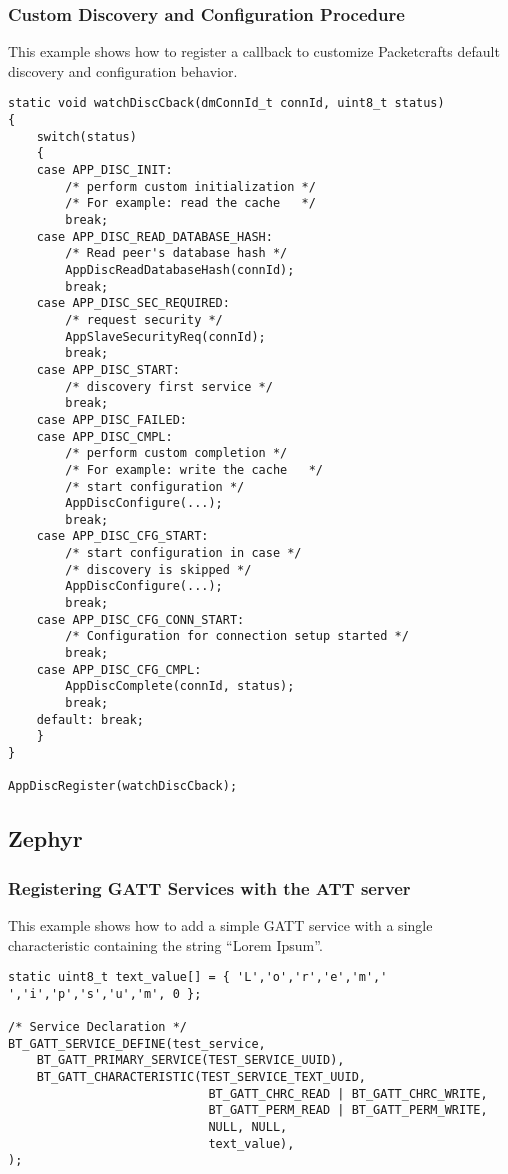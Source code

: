\subsubsection{Custom Discovery and Configuration Procedure}
This example shows how to register a callback to customize Packetcrafts default discovery and configuration behavior.
\begin{lstlisting}
static void watchDiscCback(dmConnId_t connId, uint8_t status)
{
    switch(status)
    {
    case APP_DISC_INIT:
        /* perform custom initialization */
        /* For example: read the cache   */
        break;
    case APP_DISC_READ_DATABASE_HASH:
        /* Read peer's database hash */
        AppDiscReadDatabaseHash(connId);
        break;
    case APP_DISC_SEC_REQUIRED:
        /* request security */
        AppSlaveSecurityReq(connId);
        break;
    case APP_DISC_START:
        /* discovery first service */
        break;
    case APP_DISC_FAILED:
    case APP_DISC_CMPL:
        /* perform custom completion */
        /* For example: write the cache   */
        /* start configuration */
        AppDiscConfigure(...);
        break;
    case APP_DISC_CFG_START:
        /* start configuration in case */
        /* discovery is skipped */
        AppDiscConfigure(...);
        break;
    case APP_DISC_CFG_CONN_START:
        /* Configuration for connection setup started */
        break;
    case APP_DISC_CFG_CMPL:
        AppDiscComplete(connId, status);
        break;
    default: break;
    }
}

AppDiscRegister(watchDiscCback);
\end{lstlisting}

\subsection{Zephyr}
\subsubsection{Registering GATT Services with the ATT server}
This example shows how to add a simple GATT service with a single characteristic containing the string ``Lorem Ipsum''. 
\begin{lstlisting}
static uint8_t text_value[] = { 'L','o','r','e','m',' ','i','p','s','u','m', 0 };

/* Service Declaration */
BT_GATT_SERVICE_DEFINE(test_service,
    BT_GATT_PRIMARY_SERVICE(TEST_SERVICE_UUID),
    BT_GATT_CHARACTERISTIC(TEST_SERVICE_TEXT_UUID, 
                            BT_GATT_CHRC_READ | BT_GATT_CHRC_WRITE,
                            BT_GATT_PERM_READ | BT_GATT_PERM_WRITE,
                            NULL, NULL, 
                            text_value),
);
\end{lstlisting}

